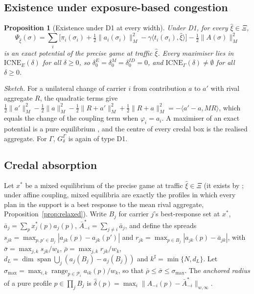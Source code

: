 \documentclass[preprint,12pt]{elsarticle}
\newtheorem{proposition}[theorem]{Proposition}
\theoremstyle{definition}
\theoremstyle{remark}
\newcommand{\cP}{\mathcal{P}}
\newcommand{\abar}{\bar a}
\newcommand{\Abar}{\bar A}
\newcommand{\spn}{\operatorname{span}}
\newcommand{\ICNE}{\mathrm{ICNE}}
\newcommand{\ip}[2]{\langle #1,#2\rangle}
\begin{document}
\subsection{Existence under exposure-based congestion}

\begin{proposition}[Existence under D1 at every width]\label{prop:D1}
Under D1, for every $\hat\xi\in\Xi$,
\[
\Psi_{\hat\xi}(\sigma)=\textstyle\sum_i\big[\pi_i(\sigma_i)+\tfrac12\|a_i(\sigma_i)\|_M^2-\gamma\ip{t_i(\sigma_i)}{\hat\xi}\big]-\tfrac12\|A(\sigma)\|_M^2
\]
is an exact potential of the precise game at traffic $\hat\xi$. Every maximiser lies in $\ICNE_E(\delta)$ for all $\delta\ge0$, so $\delta_0^E=\delta_0^M=\delta_0^{ID}=0$, and $\ICNE_\Gamma(\delta)\neq\emptyset$ for all $\delta\ge0$.
\end{proposition}

\emph{Sketch.} For a unilateral change of carrier $i$ from contribution $a$ to $a'$ with rival aggregate $R$, the quadratic terms give $\tfrac12\|a'\|_M^2-\tfrac12\|a\|_M^2-\tfrac12\|R+a'\|_M^2+\tfrac12\|R+a\|_M^2=-\ip{a'-a}{MR}$, which equals the change of the coupling term when $\varphi_i=a_i$. A maximiser of an exact potential is a pure equilibrium \citep{Monderer1996}, and the centre of every credal box is the realised aggregate. For $\Gamma$, $G^\Gamma_\delta$ is again of type D1.

\subsection{Credal absorption}

Let $x^*$ be a mixed equilibrium of the precise game at traffic $\hat\xi\in\Xi$ (it exists by \citealp{Nash1951}; under affine coupling, mixed equilibria are exactly the profiles in which every plan in the support is a best response to the mean rival aggregate, Proposition~\ref{prop:relaxed}). Write $B_j$ for carrier $j$'s best-response set at $x^*$, $\abar_j=\sum_px^*_j(p)a_j(p)$, $\Abar^*_{-i}=\sum_{j\ne i}\abar_j$, and define the spreads $s_{jk}=\max_{p,p'\in B_j}|a_{jk}(p)-a_{jk}(p')|$ and $r_{jk}=\max_{p\in B_j}|a_{jk}(p)-\abar_{jk}|$, with $\bar\sigma=\max_{j,k}s_{jk}/w_k$, $\bar\rho=\max_{j,k}r_{jk}/w_k$, $d_L=\dim\spn\bigcup_j(a_j(B_j)-a_j(B_j))$ and $k^\sharp=\min\{N,d_L\}$. Let $\sigma_{\max}=\max_{i,k}\operatorname{range}_{p\in\cP_i}a_{ik}(p)/w_k$, so that $\bar\rho\le\bar\sigma\le\sigma_{\max}$. The \emph{anchored radius} of a pure profile $p\in\prod_jB_j$ is $\hat\delta(p)=\max_i\|A_{-i}(p)-\Abar^*_{-i}\|_{w,\infty}$.
\end{document}
